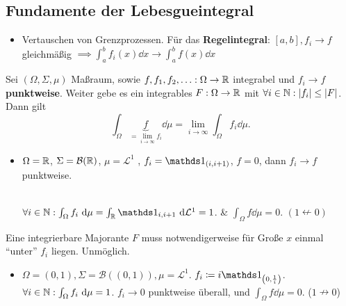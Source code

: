 \subsection{Fundamente der Lebesgueintegral}
\begin{itemize}
	\item Vertauschen von Grenzprozessen.
		Für das \textbf{Regelintegral}: $ [a, b], f_i \to f $ gleichmäßig $ \implies \int_{a}^{b} f_i(x) \dd x \to \int_{a}^{b} f(x) \dd x $
\end{itemize}
\begin{theorem}
	Sei $ (\Omega, \Sigma, \mu) $ Maßraum, sowie $ f, f_1, f_2, \dotsc : \Omega \to \mathbb{R}  $ integrabel und $ f_i \to f $ \textbf{punktweise}.
	Weiter gebe es ein integrables $ F: \Omega \to \mathbb{R}  $ mit $ \forall i \in \mathbb{N} : \left| f_i \right| \leq \left| F \right|  $.
	Dann gilt
	\[
		\int_\Omega \underbrace{f}_{= \lim_{i \to \infty} f_i} \dd \mu = \lim_{i \to \infty} \int _\Omega f_i \dd \mu.
	\]
	\begin{itemize}
		\item $ \Omega = \mathbb{R}  $, $ \Sigma = \mathcal{B} (\mathbb{R} ) $, $ \mu = \mathcal{L} ^1 $ , $ f_i = \I_{(i, i + 1)}  $, $ f = 0 $, dann $ f_i \to f $ punktweise.\\
			\\
			$ \forall i \in \N : \int _\Omega f_i \dd \mu = \int _{\R } \I_{i, i + 1} \dd \mathcal{L} ^1 = 1  $. \& $ \int _\Omega f \dd \mu = 0 $. $ (1 \nleftarrow 0) $
	\end{itemize}
	Eine integrierbare Majorante $ F $ muss notwendigerweise für Große $ x $ einmal ``unter'' $ f_i $ liegen. Unmöglich.
	\begin{itemize}
		\item $ \Omega = (0, 1), \Sigma = \mathcal{B}((0, 1)), \mu = \mathcal{L}^1  $. $ f_i \coloneqq i \I_{\left(0, \frac{ 1 }{ i } \right)}  $.
			$ \forall i \in \mathbb{N} : \int _\Omega f_i ~\text{d} \mu = 1 $.
			$ f_i \to 0 $ punktweise überall, und $ \int _\Omega f \dd \mu = 0 $. ($ 1 \nrightarrow 0 $)
	\end{itemize}
	
\end{theorem}



